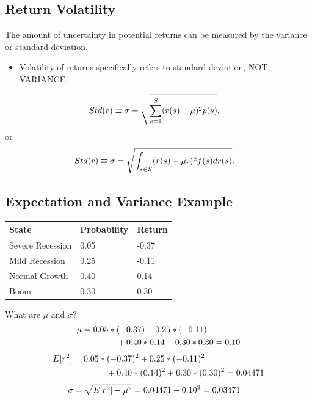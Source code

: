 \documentclass[letterpaper,10pt,english]{sphinxmanual}
\begin{document}
\subsection{Return Volatility}
\label{risk:return-volatility}
The amount of uncertainty in potential returns can be measured by the
variance or standard deviation.
\begin{itemize}
\item {} 
Volatility of returns specifically refers to standard deviation, NOT
VARIANCE.

\end{itemize}
\begin{gather}
\begin{split}Std(r) & \equiv \sigma = \sqrt{\sum_{s=1}^S (r(s) - \mu)^2 p(s)},\end{split}\notag
\end{gather}
or
\begin{gather}
\begin{split}Std(r) & \equiv \sigma = \sqrt{\int_{s \in \mathcal{S}} (r(s) -
\mu_r)^2 f(s) dr(s)}.\end{split}\notag
\end{gather}

\subsection{Expectation and Variance Example}
\label{risk:expectation-and-variance-example}
\begin{tabulary}{\linewidth}{|L|L|L|}
\hline
\textsf{\relax 
State
} & \textsf{\relax 
Probability
} & \textsf{\relax 
Return
}\\
\hline
Severe Recession
 & 
0.05
 & 
-0.37
\\

Mild Recession
 & 
0.25
 & 
-0.11
\\

Normal Growth
 & 
0.40
 & 
0.14
\\

Boom
 & 
0.30
 & 
0.30
\\
\hline\end{tabulary}


What are $\mu$ and $\sigma$?
\begin{gather}
\begin{split}\mu & = 0.05*(-0.37) + 0.25*(-0.11) \\
& \qquad \qquad + 0.40*0.14 + 0.30*0.30 = 0.10\end{split}\notag
\end{gather}\begin{gather}
\begin{split}E[r^2] & = 0.05*(-0.37)^2 + 0.25*(-0.11)^2 \\
& \qquad \qquad + 0.40*(0.14)^2 + 0.30*(0.30)^2 = 0.04471\end{split}\notag
\end{gather}\begin{gather}
\begin{split}\sigma & = \sqrt{E[r^2] - \mu^2} = 0.04471 - 0.10^2 = 0.03471\end{split}\notag
\end{gather}
\end{document}
